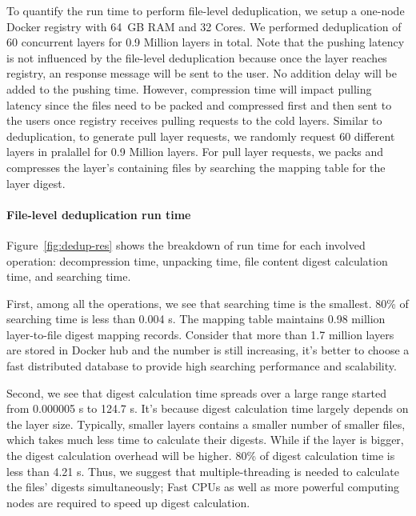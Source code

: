To quantify the run time to perform file-level deduplication, we setup a
one-node Docker registry with 64~GB RAM and 32 Cores.  
%
We performed
deduplication of 60 concurrent layers for 0.9 Million layers in total.
%
%
Note that the pushing latency is not influenced by the file-level deduplication
because once the layer reaches registry, an response message will be sent to
the user. 
%
No addition delay will be added to the pushing time. 
%
However,
compression time will impact pulling latency since the files need to be packed
and compressed first and then sent to the users once registry receives pulling
requests to the cold layers. 
%
Similar to deduplication, to generate pull layer
requests, we randomly request 60 different layers in pralallel for 0.9 Million
layers. 
%
For pull layer requests, we packs and compresses the layer's containing
files by searching the mapping table for the layer digest. 

\paragraph{File-level deduplication run time}

%
Figure~\ref{fig:dedup-res} shows the breakdown of run time for each
involved operation: decompression time, unpacking time, file content digest
calculation time, and searching time.

First, among all the operations, we see that searching time is the
smallest. 
%
80\% of searching time is less than 0.004 s. 
%
The mapping table
maintains 0.98 million layer-to-file digest mapping records. 
%
Consider that more
than 1.7 million layers are stored in Docker hub and the number is still
increasing, it's better to choose a fast distributed database to provide high
searching performance and scalability.
%
  
Second, we see that digest calculation time spreads over a large range started
from 0.000005 s to 124.7 s. 
%
It's because digest calculation time largely
depends on the layer size. 
%
Typically, smaller layers contains a smaller number
of smaller files, which takes much less time to calculate their digests. 
%
While
if the layer is bigger, the digest calculation overhead will be higher. 
%
80\% of
digest calculation time is less than 4.21 s. 
%
Thus, we suggest that multiple-threading is needed to calculate the files'
digests simultaneously; 
%
Fast CPUs as well as more powerful computing nodes are
required to speed up digest calculation.

